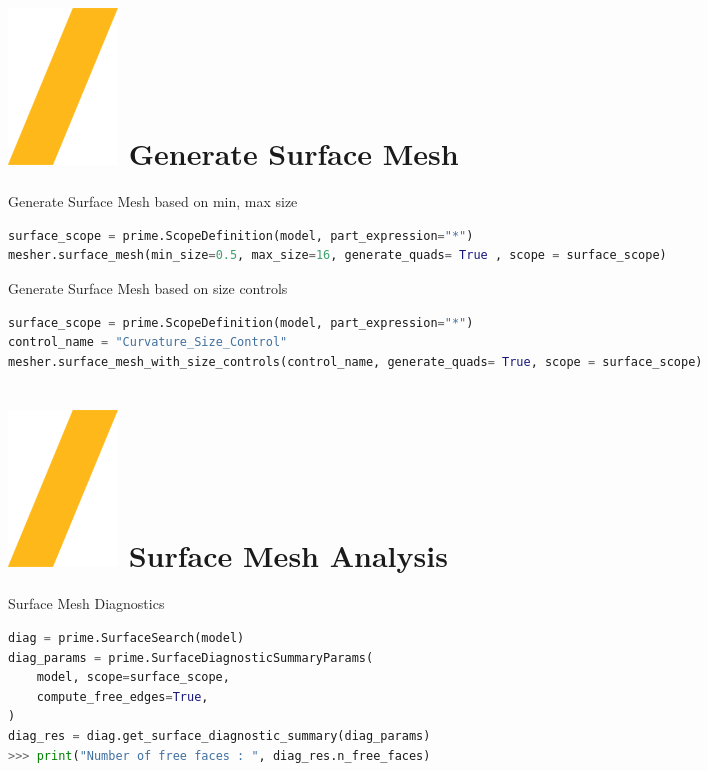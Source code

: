 \documentclass[9pt,landscape]{article}
\begin{document}
\begin{multicols}{3}
\section{\includegraphics[height=\fontcharht\font`\S]{slash.png} Generate Surface Mesh}
Generate Surface Mesh based on min, max size  
\begin{lstlisting}[language=Python]
surface_scope = prime.ScopeDefinition(model, part_expression="*")
mesher.surface_mesh(min_size=0.5, max_size=16, generate_quads= True , scope = surface_scope)
\end{lstlisting}

Generate Surface Mesh based on size controls  
\begin{lstlisting}[language=Python]
surface_scope = prime.ScopeDefinition(model, part_expression="*")
control_name = "Curvature_Size_Control"
mesher.surface_mesh_with_size_controls(control_name, generate_quads= True, scope = surface_scope)
\end{lstlisting}

\section{\includegraphics[height=\fontcharht\font`\S]{slash.png} Surface Mesh Analysis}
Surface Mesh Diagnostics 
\begin{lstlisting}[language=Python]
diag = prime.SurfaceSearch(model)
diag_params = prime.SurfaceDiagnosticSummaryParams(
    model, scope=surface_scope,
    compute_free_edges=True,
) 
diag_res = diag.get_surface_diagnostic_summary(diag_params)
>>> print("Number of free faces : ", diag_res.n_free_faces)
\end{lstlisting}


\end{multicols}
\end{document}
